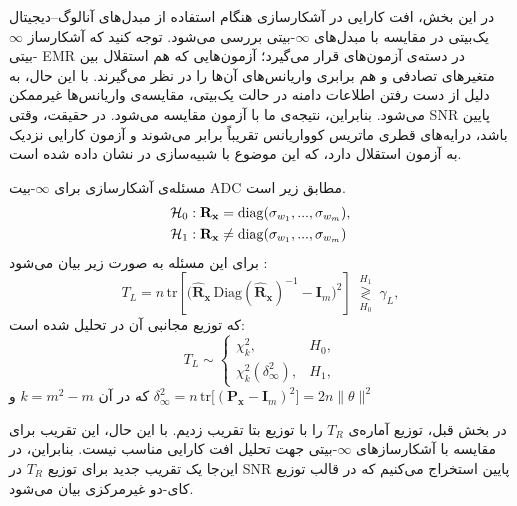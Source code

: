 
در این بخش، افت کارایی در آشکارسازی هنگام استفاده از مبدل‌های آنالوگ–دیجیتال یک‌بیتی 
 در مقایسه با مبدل‌های $\infty$-بیتی بررسی می‌شود.  
توجه کنید که آشکارساز $\infty$-بیتی EMR در دسته‌ی آزمون‌های  قرار می‌گیرد؛ آزمون‌هایی که هم استقلال بین متغیرهای تصادفی و هم برابری واریانس‌های آن‌ها را در نظر می‌گیرند.  
با این حال، به دلیل از دست رفتن اطلاعات دامنه در حالت یک‌بیتی، مقایسه‌ی واریانس‌ها غیرممکن می‌شود.  
بنابراین، نتیجه‌ی ما با آزمون  مقایسه می‌شود.  
در حقیقت، وقتی SNR پایین باشد، درایه‌های قطری ماتریس کوواریانس تقریباً برابر می‌شوند و آزمون  کارایی نزدیک به آزمون استقلال دارد، که این موضوع با شبیه‌سازی در  نشان داده شده است.


مسئله‌ی آشکارسازی برای $\infty$-بیت ADC مطابق زیر است.  
\begin{align}
	\mathcal{H}_0 &: \mathbf{R}_\mathbf{x} = \mathrm{diag}(\sigma_{w_1}, ..., \sigma_{w_m}), \notag \\
	\mathcal{H}_1 &: \mathbf{R}_\mathbf{x} \neq \mathrm{diag}(\sigma_{w_1}, ..., \sigma_{w_m}) \notag
\end{align}
 برای این مسئله به صورت زیر بیان می‌شود :
\begin{equation}
	T_{L}=n\,\mathrm{tr}\!\left[\big(\hat{\mathbf{R}}_{\mathbf{x}}\,\mathrm{Diag}(\hat{\mathbf{R}}_{\mathbf{x}})^{-1}-\mathbf{I}_{m}\big)^{2}\right]
	\;\underset{H_{0}}{\overset{H_{1}}{\gtrless}}\;\gamma_{L}, \label{eq:LMPIT}
\end{equation}
که توزیع مجانبی آن در  تحلیل شده است:
\begin{equation}
	T_{L}\sim
	\begin{cases}
		\chi^{2}_{k}, & H_{0},\\[6pt]
		\chi^{2}_{k}(\delta_{\infty}^{2}), & H_{1},
	\end{cases}
\end{equation}
که در آن $k=m^{2}-m$ و
$
	\delta_{\infty}^{2}=n\,\mathrm{tr}\!\big[(\mathbf{P}_{\mathbf{x}}-\mathbf{I}_{m})^{2}\big]=2n\|\theta\|^{2}
$

در بخش قبل، توزیع آماره‌ی $T_{R}$ را با توزیع بتا تقریب زدیم.  
با این حال، این تقریب برای مقایسه با آشکارسازهای $\infty$-بیتی جهت تحلیل افت کارایی مناسب نیست.  
بنابراین، در این‌جا یک تقریب جدید برای توزیع $T_{R}$ در SNR پایین استخراج می‌کنیم که در قالب توزیع کای-دو غیرمرکزی بیان می‌شود.  

